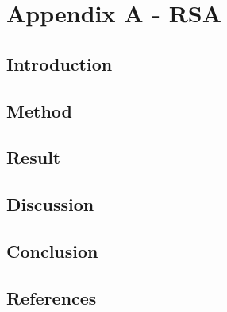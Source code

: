\section{Appendix A - RSA}

\subsection*{Introduction}

\subsection*{Method}

\subsection*{Result}
%

\subsection*{Discussion}



\subsection*{Conclusion}

\subsection*{References}